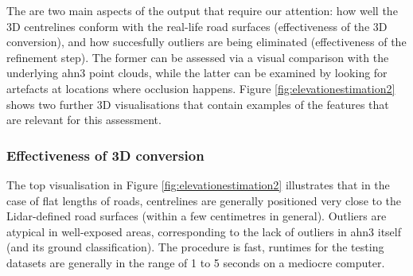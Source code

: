 The are two main aspects of the output that require our attention: how well the 3D centrelines conform with the real-life road surfaces (effectiveness of the 3D conversion), and how succesfully outliers are being eliminated (effectiveness of the refinement step). The former can be assessed via a visual comparison with the underlying \ac{ahn3} point clouds, while the latter can be examined by looking for artefacts at locations where occlusion happens. Figure \ref{fig:elevationestimation2} shows two further 3D visualisations that contain examples of the features that are relevant for this assessment.

\subsubsection{Effectiveness of 3D conversion}

The top visualisation in Figure \ref{fig:elevationestimation2} illustrates that in the case of flat lengths of roads, centrelines are generally positioned very close to the Lidar-defined road surfaces (within a few centimetres in general). Outliers are atypical in well-exposed areas, corresponding to the lack of outliers in \ac{ahn3} itself (and its ground classification). The procedure is fast, runtimes for the testing datasets are generally in the range of 1 to 5 seconds on a mediocre computer.

